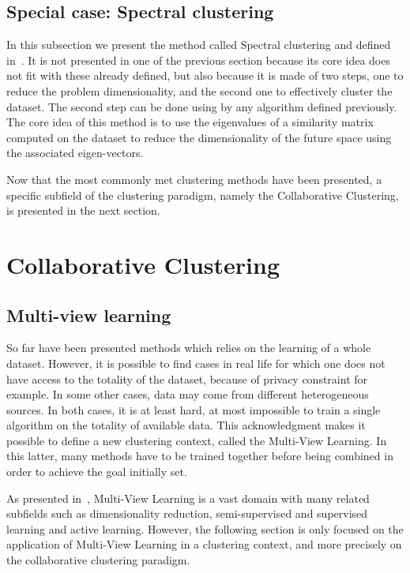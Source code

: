 \documentclass[a4paper]{report}
\begin{document}
    \subsection{Special case: Spectral clustering}

    In this subsection we present the method called Spectral clustering and defined in~\cite{Ng01onspectral}. It is not presented in one of the previous section because its core idea does not fit with these already defined, but also because it is made of two steps, one to reduce the problem dimensionality, and the second one to effectively cluster the dataset. The second step can be done using by any algorithm defined previously. The core idea of this method is to use the eigenvalues of a similarity matrix computed on the dataset to reduce the dimensionality of the future space using the associated eigen-vectors.

    Now that the most commonly met clustering methods have been presented, a specific subfield of the clustering paradigm, namely the Collaborative Clustering, is presented in the next section.

    \section{Collaborative Clustering}
\label{sec:soa_cc}

    \subsection{Multi-view learning}

    So far have been presented methods which relies on the learning of a whole dataset. However, it is possible to find cases in real life for which one does not have access to the totality of the dataset, because of privacy constraint for example. In some other cases, data may come from different heterogeneous sources. In both cases, it is at least hard, at most impossible to train a single algorithm on the totality of available data. This acknowledgment makes it possible to define a new clustering context, called the Multi-View Learning. In this latter, many methods have to be trained together before being combined in order to achieve the goal initially set.
    
    As presented in~\cite{sun2013survey}, Multi-View Learning is a vast domain with many related subfields such as dimensionality reduction, semi-supervised and supervised learning and active learning. However, the following section is only focused on the application of Multi-View Learning in a clustering context, and more precisely on the collaborative clustering paradigm.
    
\end{document}
